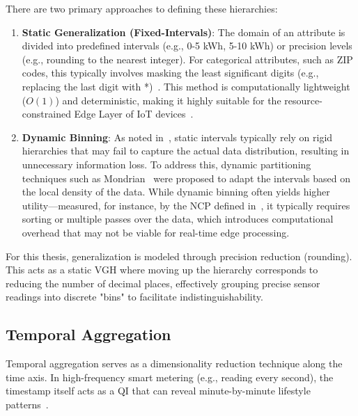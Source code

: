 There are two primary approaches to defining these hierarchies:

\begin{enumerate}
    
    \item\textbf{Static Generalization (Fixed-Intervals)}: The domain of an attribute is divided into predefined intervals (e.g., 0-5 kWh, 5-10 kWh) or precision levels (e.g., rounding to the nearest integer). For categorical attributes, such as ZIP codes, this typically involves masking the least significant digits (e.g., replacing the last digit with *)~\cite{Sweeney_kanon}. This method is computationally lightweight ($O(1)$) and deterministic, making it highly suitable for the resource-constrained Edge Layer of \ac{IoT} devices~\cite{edgecomputing}.

    \item\textbf{Dynamic Binning}: As noted in~\cite{UtilityBasedAnonymizationNCP}, static intervals typically rely on rigid hierarchies that may fail to capture the actual data distribution, resulting in unnecessary information loss. To address this, dynamic partitioning techniques such as Mondrian~\cite{DynamicBinningMondrian} were proposed to adapt the intervals based on the local density of the data. While dynamic binning often yields higher utility—measured, for instance, by the \ac{NCP} defined in~\cite{UtilityBasedAnonymizationNCP}, it typically requires sorting or multiple passes over the data, which introduces computational overhead that may not be viable for real-time edge processing.

\end{enumerate}

For this thesis, generalization is modeled through precision reduction (rounding). This acts as a static VGH where moving up the hierarchy corresponds to reducing the number of decimal places, effectively grouping precise sensor readings into discrete "bins" to facilitate indistinguishability.

\subsection{Temporal Aggregation}
Temporal aggregation serves as a dimensionality reduction technique along the time axis. In high-frequency smart metering (e.g., reading every second), the timestamp itself acts as a \ac{QI} that can reveal minute-by-minute lifestyle patterns~\cite{InferringPersonalInformationFromDRS}.


